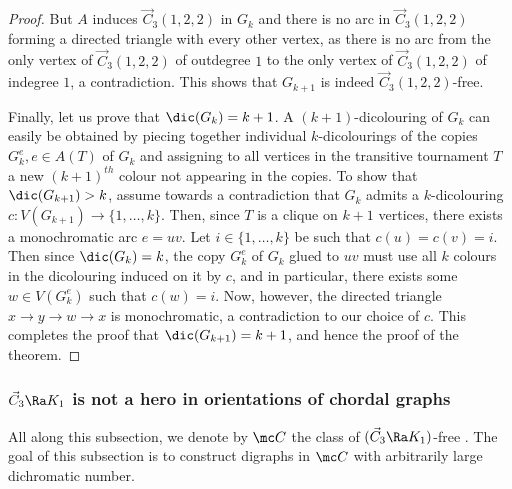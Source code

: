 \begin{proof}
But $A$ induces $\vec C_{3}(1,2,2)$ in $G_{k}$ and there is no arc in $\vec C_{3}(1,2,2)$ forming a directed triangle with every other vertex, as there is no arc from the only vertex of $\vec C_{3}(1,2,2)$ of outdegree $1$ to the only vertex of $\vec C_{3}(1,2,2)$ of indegree $1$, a contradiction.  This shows that $G_{k+1}$ is indeed $\vec C_{3}(1,2,2)$-free.

Finally, let us prove that $\dic(G_k)=k+1$. A $(k+1)$-dicolouring of $G_k$ can easily be obtained by piecing together individual $k$-dicolourings of the copies $G_k^e, e \in A(T)$ of $G_k$ and assigning to all vertices in the transitive tournament $T$ a new $(k+1)^{th}$ colour not appearing in the copies. To show that $\dic(G_{k+1})>k$, assume towards a contradiction that $G_k$ admits a $k$-dicolouring $c:V(G_{k+1}) \rightarrow \{1,\ldots,k\}$. 
Then, since $T$ is a clique on $k+1$ vertices, there exists a monochromatic arc $e=uv$. Let $i \in \{1,\ldots,k\}$ be such that $c(u)=c(v)=i$. Then since $\dic(G_k)=k$, the copy $G_k^e$ of $G_k$ glued to $uv$ must use all $k$ colours in the dicolouring induced on it by $c$, and in particular, there exists some $w \in V(G_k^e)$ such that $c(w)=i$. Now, however, the directed triangle $x \rightarrow y \rightarrow w \rightarrow x$ is monochromatic, a contradiction to our choice of $c$. This completes the proof that $\dic(G_{k+1})=k+1$, and hence the proof of the theorem. 
\end{proof}



\subsubsection{$\vec C_3 \Ra K_1$ is not a hero in orientations of chordal graphs}\label{subsec:1C3}

All along this subsection, we denote by $\mc C$ the class of $(\vec C_3 \Ra K_1)$-free \ocgs. The goal of this subsection is to construct digraphs in $\mc C$ with arbitrarily large dichromatic number. 



